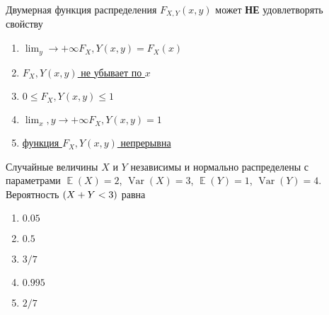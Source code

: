 \documentclass[t]{beamer}
\DeclareMathOperator{\Var}{Var}
\DeclareMathOperator{\E}{\mathbb{E}}
\let\P\relax
\DeclareMathOperator{\P}{\mathbb{P}}
\begin{document}
 \begin{frame} \label{3} 
\begin{block}{3} 

  Двумерная функция распределения $F_{X,Y}(x,y)$ может \textbf{НЕ} удовлетворять свойству
  


 \end{block} 
\begin{enumerate} 
\item[] \hyperlink{3-No}{\beamergotobutton{} $\lim_y \to +\infty F_X,Y(x,y) = F_X(x)$}
\item[] \hyperlink{3-Yes}{\beamergotobutton{} $F_X,Y(x,y)$ не убывает по $x$}
\item[] \hyperlink{3-No}{\beamergotobutton{} $0 \leq F_X,Y(x, y)\leq 1$}
\item[] \hyperlink{3-No}{\beamergotobutton{} $\lim_x,y \to +\infty F_X,Y(x,y) = 1$}
\item[] \hyperlink{3-No}{\beamergotobutton{} функция $F_X,Y(x, y)$ непрерывна}
\end{enumerate} 
\end{frame} 


 \begin{frame} \label{4} 
\begin{block}{4} 

  Случайные величины $X$ и $Y$ независимы и нормально распределены с параметрами $\E(X)=2$, $\Var(X)=3$, $\E(Y)=1$, $\Var(Y)=4$. Вероятность $\P(X+Y<3)$ равна
  


 \end{block} 
\begin{enumerate} 
\item[] \hyperlink{4-No}{\beamergotobutton{} $0.05$}
\item[] \hyperlink{4-Yes}{\beamergotobutton{} $0.5$}
\item[] \hyperlink{4-No}{\beamergotobutton{} $3/7$}
\item[] \hyperlink{4-No}{\beamergotobutton{} $0.995$}
\item[] \hyperlink{4-No}{\beamergotobutton{} $2/7$}
\end{enumerate} 
\end{frame} 
\end{document}
